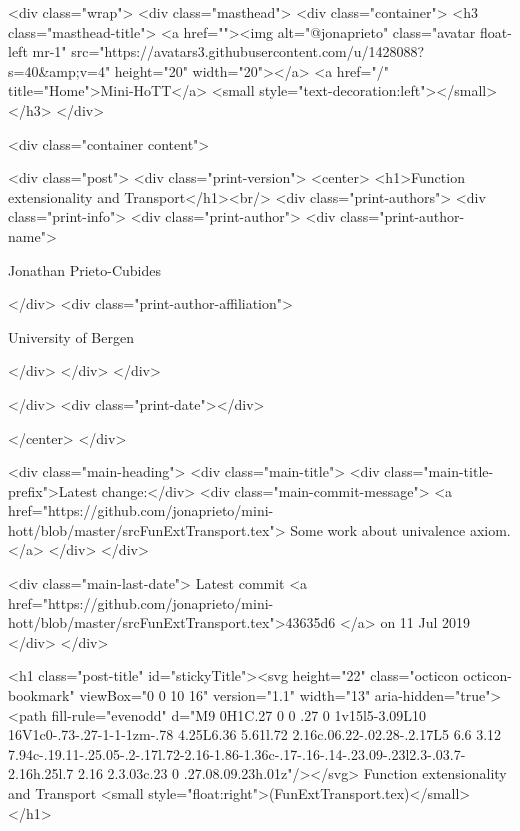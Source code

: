     <div class="wrap">
      <div class="masthead">
        <div class="container">
          <h3 class="masthead-title">
            <a href=""><img alt="@jonaprieto" class="avatar float-left mr-1" src="https://avatars3.githubusercontent.com/u/1428088?s=40&amp;v=4" height="20" width="20"></a>
            <a href="/" title="Home">Mini-HoTT</a>
            <small style="text-decoration:left"></small>
          </h3>
        </div>
      
      <div class="container content">
        







<div class="post">
  <div class="print-version">
    <center>
      <h1>Function extensionality and Transport</h1><br/>
        <div class="print-authors">
          <div class="print-info">
            <div class="print-author">
              <div class="print-author-name">
                
                  Jonathan Prieto-Cubides
                
              </div>
              <div class="print-author-affiliation">
                
                  University of Bergen
                
                </div>
            </div>
          </div>
          
          
        </div>
        <div class="print-date"></div>
        
        
    </center>
  </div>

  
  <div class="main-heading">
    <div class="main-title">
      <div class="main-title-prefix">Latest change:</div>
      <div class="main-commit-message">
            <a href="https://github.com/jonaprieto/mini-hott/blob/master/srcFunExtTransport.tex">
              Some work about univalence axiom.</a>
      </div>
    </div>

    <div class="main-last-date">
      Latest commit <a href="https://github.com/jonaprieto/mini-hott/blob/master/srcFunExtTransport.tex">43635d6 </a> on  11 Jul 2019
    </div>
  </div>
  

  <h1 class="post-title" id="stickyTitle"><svg height="22" class="octicon octicon-bookmark" viewBox="0 0 10 16" version="1.1" width="13" aria-hidden="true"><path fill-rule="evenodd" d="M9 0H1C.27 0 0 .27 0 1v15l5-3.09L10 16V1c0-.73-.27-1-1-1zm-.78 4.25L6.36 5.61l.72 2.16c.06.22-.02.28-.2.17L5 6.6 3.12 7.94c-.19.11-.25.05-.2-.17l.72-2.16-1.86-1.36c-.17-.16-.14-.23.09-.23l2.3-.03.7-2.16h.25l.7 2.16 2.3.03c.23 0 .27.08.09.23h.01z"/></svg> Function extensionality and Transport <small style="float:right">(FunExtTransport.tex)</small>
  </h1>

